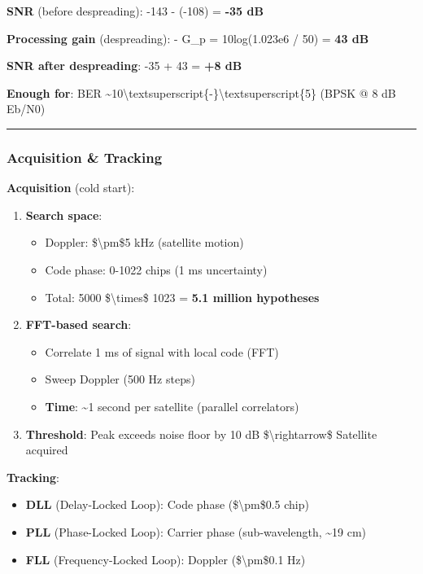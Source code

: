 \textbf{SNR} (before despreading): -143 - (-108) = \textbf{-35 dB}

\textbf{Processing gain} (despreading): - G\_p = 10log(1.023e6 / 50) =
\textbf{43 dB}

\textbf{SNR after despreading}: -35 + 43 = \textbf{+8 dB}

\textbf{Enough for}: BER
\textasciitilde10\textbackslash textsuperscript\{-\}\textbackslash textsuperscript\{5\}
(BPSK @ 8 dB Eb/N0)

\begin{center}\rule{0.5\linewidth}{0.5pt}\end{center}

\subsubsection{Acquisition \& Tracking}\label{acquisition-tracking}

\textbf{Acquisition} (cold start):

\begin{enumerate}
\def\labelenumi{\arabic{enumi}.}
\tightlist
\item
  \textbf{Search space}:

  \begin{itemize}
  \tightlist
  \item
    Doppler: \$\textbackslash pm\$5 kHz (satellite motion)
  \item
    Code phase: 0-1022 chips (1 ms uncertainty)
  \item
    Total: 5000 \$\textbackslash times\$ 1023 = \textbf{5.1 million
    hypotheses}
  \end{itemize}
\item
  \textbf{FFT-based search}:

  \begin{itemize}
  \tightlist
  \item
    Correlate 1 ms of signal with local code (FFT)
  \item
    Sweep Doppler (500 Hz steps)
  \item
    \textbf{Time}: \textasciitilde1 second per satellite (parallel
    correlators)
  \end{itemize}
\item
  \textbf{Threshold}: Peak exceeds noise floor by 10 dB
  \$\textbackslash rightarrow\$ Satellite acquired
\end{enumerate}

\textbf{Tracking}:

\begin{itemize}
\tightlist
\item
  \textbf{DLL} (Delay-Locked Loop): Code phase (\$\textbackslash pm\$0.5
  chip)
\item
  \textbf{PLL} (Phase-Locked Loop): Carrier phase (sub-wavelength,
  \textasciitilde19 cm)
\item
  \textbf{FLL} (Frequency-Locked Loop): Doppler
  (\$\textbackslash pm\$0.1 Hz)
\end{itemize}

